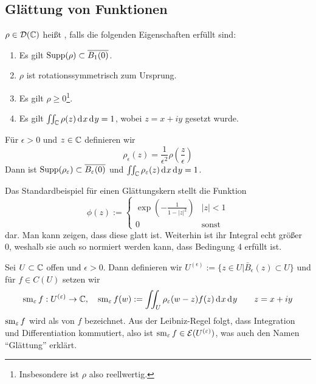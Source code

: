 \subsection{Glättung von Funktionen}
\label{sec:Glättung}

\begin{defin}[Glättungskern]
  $\rho \in \mathcal{D}(\mathbb{C})$ heißt , falls die folgenden
  Eigenschaften erfüllt sind:
  \begin{enumerate}
  \item Es gilt $\operatorname{Supp}(\rho) \subset \overline{B_1(0)}$.
  \item $\rho$ ist rotationssymmetrisch zum Ursprung.
  \item Es gilt $\rho \geq 0$\footnote{Insbesondere ist $\rho$ also reellwertig.}.
  \item Es gilt $\iint_\C \rho(z) \d[x]\d[y] = 1$, wobei $z = x + iy$
    gesetzt wurde.
  \end{enumerate}
  Für $\epsilon > 0$ und $z \in \mathbb{C}$ definieren wir
  \[
  \rho_\epsilon(z) = \frac{1}{\epsilon^2} \rho\left(
    \frac{z}{\epsilon} \right )
  \]
  Dann ist $\operatorname{Supp}(\rho_\varepsilon) \subset \overline{B_\varepsilon(0)}$ und
  $\iint_\C \rho_\epsilon(z) \d[x]\d[y] = 1$.
\end{defin}


\begin{bsp}
  Das Standardbeispiel für einen Glättungskern stellt die Funktion
  \[
  \phi(z) :=
  \begin{cases}
    \exp \left ( - \frac{1}{1 - |z|^2} \right ) & |z| < 1 \\
    0 & \text{sonst}
  \end{cases}
  \]
  dar. 
  Man kann zeigen, dass diese glatt ist. Weiterhin ist ihr Integral
  echt größer 0, weshalb sie auch so normiert werden kann, dass
  Bedingung 4 erfüllt ist.
\end{bsp}

\begin{defin}
  Sei $U \subset \mathbb{C}$ offen und $\epsilon > 0$. Dann definieren wir
  $U^{(\epsilon)} := \{z \in U | \bar B_\epsilon(z) \subset U \}$ und
  für $f \in C(U)$ setzen wir
  \[
  \sm_\epsilon f : U^{(\epsilon)} \ra \C, \quad \sm_\epsilon f(w) :=
  \iint_U \rho_\epsilon(w- z) f(z) \d[x]\d[y] \qquad z = x + iy
  \]
  $\operatorname{sm}_\varepsilon f$ wird als  von $f$ bezeichnet. 
  Aus der Leibniz-Regel folgt, dass Integration und Differentiation
  kommutiert, also ist $\operatorname{sm}_\varepsilon f \in \mathcal{E}(U^{(\varepsilon)})$, was
  auch den Namen "`Glättung"' erklärt.
\end{defin}

